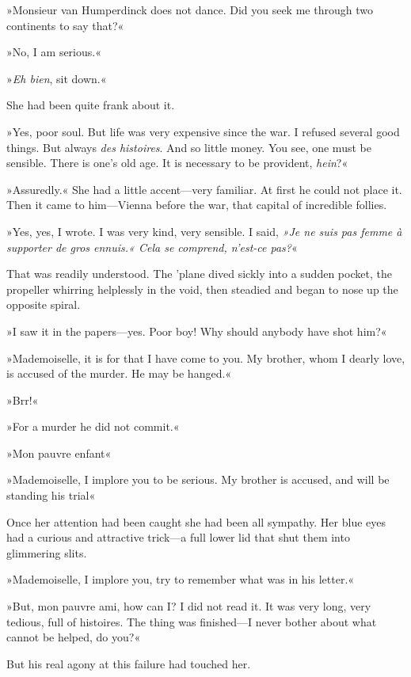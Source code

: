 »Monsieur van Humperdinck does not dance. Did you seek me through two
continents to say that?«

»No, I am serious.«

»\textit{Eh bien}, sit down.«

She had been quite frank about it.

»Yes, poor soul. But life was very expensive since the war. I refused
several good things. But always \textit{des histoires}. And so little money.
You see, one must be sensible. There is one's old age. It is necessary
to be provident, \textit{hein}?«

»Assuredly.« She had a little accent\allowbreak---\allowbreak very familiar. At first he could
not place it. Then it came to him\allowbreak---\allowbreak Vienna before the war, that capital
of incredible follies.

»Yes, yes, I wrote. I was very kind, very sensible. I said, \foreignlanguage{french}{\textit{»Je ne suis pas femme à supporter de gros ennuis.« Cela se comprend, n'est-ce pas?}}«

That was readily understood. The 'plane dived sickly into a sudden pocket, the propeller whirring helplessly in the void, then steadied and began to nose up the opposite spiral.

»I saw it in the papers\allowbreak---\allowbreak yes. Poor boy! Why should anybody have shot him?«

»Mademoiselle, it is for that I have come to you. My brother, whom I dearly love, is accused of the murder. He may be hanged.«

»Brr!«

»For a murder he did not commit.«

»Mon pauvre enfant\longdash«

»Mademoiselle, I implore you to be serious. My brother is accused, and will be standing his trial\longdash«

Once her attention had been caught she had been all sympathy. Her blue eyes had a curious and attractive trick\allowbreak---\allowbreak a full lower lid that shut them into glimmering slits.

»Mademoiselle, I implore you, try to remember what was in his letter.«

»But, mon pauvre ami, how can I? I did not read it. It was very long, very tedious, full of histoires. The thing was finished\allowbreak---\allowbreak I never bother about what cannot be helped, do you?«

But his real agony at this failure had touched her.

